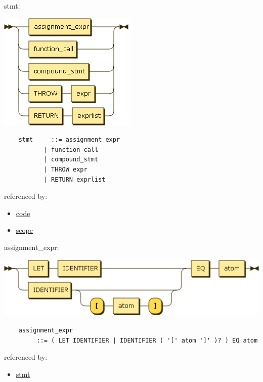 \begin{minipage}{\textwidth}
    \protect\hypertarget{stmt}{}{stmt:}

    \includegraphics[width=2.56250in,height=2.20833in]{diagram/stmt.png}

    \begin{verbatim}
    stmt     ::= assignment_expr
           | function_call
           | compound_stmt
           | THROW expr
           | RETURN exprlist
    \end{verbatim}

    referenced by:

    \begin{itemize}
            \tightlist
        \item
            \protect\hyperlink{code}{code}
        \item
            \protect\hyperlink{scope}{scope}
    \end{itemize}

\end{minipage}

\begin{minipage}{\textwidth}
    \protect\hypertarget{assignment_expr}{}{assignment\_expr:}

    \includegraphics[width=5.37500in,height=1.16667in]{diagram/assignment_expr.png}

    \begin{verbatim}
    assignment_expr
         ::= ( LET IDENTIFIER | IDENTIFIER ( '[' atom ']' )? ) EQ atom
    \end{verbatim}

    referenced by:

    \begin{itemize}
            \tightlist
        \item
            \protect\hyperlink{stmt}{stmt}
    \end{itemize}

\end{minipage}

